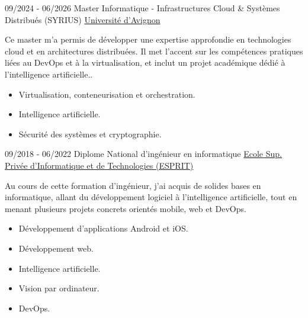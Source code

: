 \documentclass[9pt]{developercv} %
\begin{document}
\vspace{-10 pt}
\begin{entrylist}
    \entry
    {09/2024 - 06/2026}
    {Master Informatique - Infrastructures Cloud \& Systèmes Distribués (SYRIUS)}
    {\href{https://formations.univ-avignon.fr/formation/master-informatique-systemes-informatiques-communicants-reseaux-services-et-securite-sicom/}{Université d'Avignon}}
    {
        Ce master m'a permis de développer une expertise approfondie en technologies cloud et en architectures distribuées. Il met l'accent sur les compétences pratiques liées au DevOps et à la virtualisation, et inclut un projet académique dédié à l'intelligence artificielle..
        \begin{itemize}[noitemsep,topsep=0pt,parsep=0pt,partopsep=0pt, leftmargin=0pt]
            \item Virtualisation, conteneurisation et orchestration.
            \item Intelligence artificielle.
            \item Sécurité des systèmes et cryptographie.
        \end{itemize}
    }

    \entry
    {09/2018 - 06/2022}
    {Diplome National d'ingénieur en informatique}
    {\href{https://www.esprit.tn}{Ecole Sup. Privée d'Informatique et de Technologies (ESPRIT)}}
    {
        Au cours de cette formation d'ingénieur, j'ai acquis de solides bases en informatique, allant du développement logiciel à l'intelligence artificielle, tout en menant plusieurs projets concrets orientés mobile, web et DevOps.
        \begin{itemize}[noitemsep,topsep=0pt,parsep=0pt,partopsep=0pt, leftmargin=0pt]
            \item Développement d'applications Android et iOS.
            \item Développement web.
            \item Intelligence artificielle.
            \item Vision par ordinateur.
            \item DevOps.
        \end{itemize}
    }
\end{entrylist}
\end{document}
